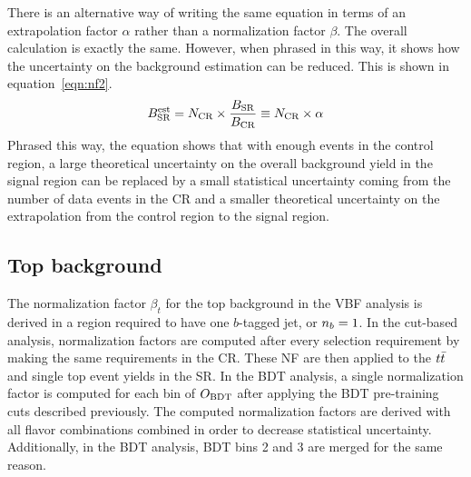 There is an alternative way of writing the same equation in terms of an extrapolation factor $\alpha$ rather than a normalization factor $\beta$. The overall calculation is exactly the same. However, when phrased in this way, it shows how the uncertainty on the background estimation can be reduced. This is shown in equation~\ref{eqn:nf2}.
%
\begin{equation}
B_{\rm SR}^{\rm est} = N_{\rm CR} \times \frac{B_{\rm SR}}{B_{\rm CR}} \equiv N_{\rm CR} \times \alpha
\label{eqn:nf2}
\end{equation}
%
Phrased this way, the equation shows that with enough events in the control region, a large theoretical uncertainty on the overall background yield in the signal region can be replaced by a small statistical uncertainty coming from the number of data events in the CR and a smaller theoretical uncertainty on the extrapolation from the control region to the signal region. 

\subsection{Top background}

The normalization factor $\beta_{t}$ for the top background in the VBF analysis is derived in a region required to have one $b$-tagged jet, or $n_b = 1$. In the cut-based analysis, normalization factors are computed after every selection requirement by making the same requirements in the CR. These NF are then applied to the $t\bar{t}$ and single top event yields in the SR. In the BDT analysis, a single normalization factor is computed for each bin of $O_{\rm BDT}$ after applying the BDT pre-training cuts described previously. The computed normalization factors are derived with all flavor combinations combined in order to decrease statistical uncertainty. Additionally, in the BDT analysis, BDT bins 2 and 3 are merged for the same reason.

